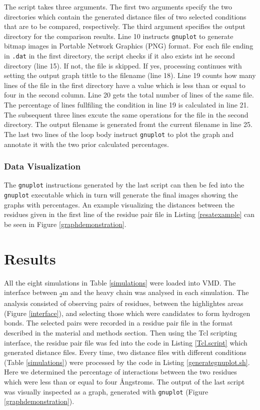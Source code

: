 \documentclass[11pt,twocolumn]{article}
\newcommand{\angstr}{{\AA}ngstroms\xspace}
\newcommand{\btm}{\textbeta\textsubscript{2}m\xspace}
\begin{document}
The script takes three arguments. The first two arguments specify the two directories which contain the generated distance files of two selected conditions that are to be compared, respectively. The third argument specifies the output directory for the comparison results. Line 10 instructs \texttt{gnuplot} to generate bitmap images in Portable Network Graphics (PNG) format. For each file ending in \texttt{.dat} in the first directory, the script checks if it also exists int he second directory (line 15). If not, the file is skipped. If yes, processing continues with setting the output graph tittle to the filename (line 18). Line 19 counts how many lines of the file in the first directory have a value which is less than or equal to four in the second column. Line 20 gets the total number of lines of the same file. The percentage of lines fullfiling the condition in line 19 is calculated in line 21. The subsequent three lines excute the same operations for the file in the second directory. The output filename is generated fromt the current filename in line 25. The last two lines of the loop body instruct \texttt{gnuplot} to plot the graph and annotate it with the two prior calculated percentages.  

\subsubsection*{Data Visualization}

The \texttt{gnuplot} instructions generated by the last script can then be fed into the \texttt{gnuplot} executable which in turn will generate the final images showing the graphs with percentages. An example visualizing the distances between the residues given in the first line of the residue pair file in Listing \ref{resatexample} can be seen in Figure \ref{graphdemonstration}.


\section*{Results}

All the eight simulations in Table \ref{simulations} were loaded into VMD. The interface between \btm and the heavy chain was analysed in each simulation. The analysis consisted of observing pairs of residues, between the highlightes areas (Figure \ref{interface}), and selecting those which were candidates to form hydrogen bonds. 
The selected pairs were recorded in a residue pair file in the format described in the material and methods section. Then using the 
Tcl scripting interface, the residue pair file was fed into the code in Listing \ref{Tcl.script} which generated distance files. Every time, two distance files with different conditions (Table \ref{simulations}) were processed by the code in Listing \ref{generategnuplot.sh}. Here we determined the percentage of interactions between the two residues which were less than or equal to four \angstr. The output of the last script  was visually inspected as a graph, generated with \texttt{gnuplot} (Figure \ref{graphdemonstration}).
\end{document}
